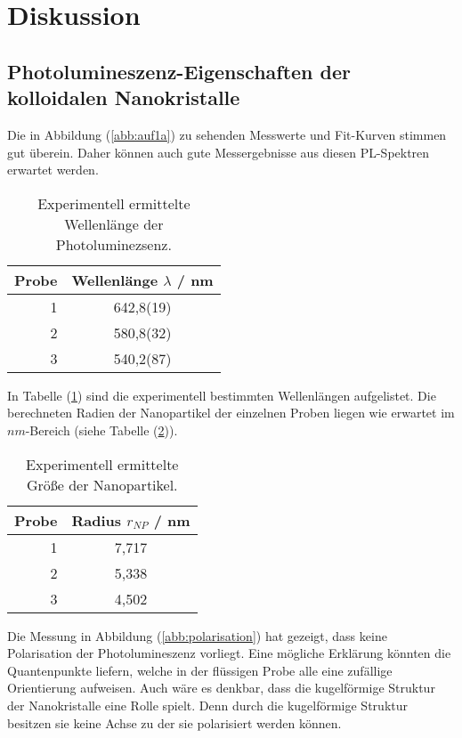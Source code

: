 \section{Diskussion}
\subsection{Photolumineszenz-Eigenschaften der kolloidalen Nanokristalle}
Die in Abbildung (\ref{abb:auf1a}) zu sehenden Messwerte und Fit-Kurven stimmen gut \"{u}berein.
Daher k\"{o}nnen auch gute Messergebnisse aus diesen PL-Spektren erwartet werden.
\begin{table}
	\centering
	\caption{Experimentell ermittelte Wellenl\"{a}nge der Photoluminezsenz.}
\begin{tabular}{|r|c|}
	\hline
	{Probe} & {Wellenl\"{a}nge $\lambda$ / nm} \\
	\hline
	1	& 642,8(19)  \\
	2	& 580,8(32)  \\
	3	& 540,2(87)  \\
	\hline
\end{tabular}
\label{tab:disku1}
\end{table}
In Tabelle (\ref{tab:disku1}) sind die experimentell bestimmten Wellenl\"{a}ngen aufgelistet.
Die berechneten Radien der Nanopartikel der einzelnen Proben liegen wie erwartet im $nm$-Bereich (siehe Tabelle (\ref{tab:disku2})).
\begin{table}
	\centering
	\caption{Experimentell ermittelte Gr\"{o}{\ss}e der Nanopartikel.}
\begin{tabular}{|r|c|}
	\hline
	{Probe} & {Radius $r_{NP}$ / nm} \\
	\hline
	1	&	7,717	\\
	2	&	5,338	\\
	3	&	4,502	\\
	\hline
\end{tabular}
\label{tab:disku2}
\end{table}

\bigskip
Die Messung in Abbildung (\ref{abb:polarisation}) hat gezeigt, dass keine Polarisation der Photolumines{\-}zenz vorliegt.
Eine m\"{o}gliche Erkl\"{a}rung k\"{o}nnten die Quantenpunkte liefern, welche in der fl\"{u}ssigen Probe alle eine zuf\"{a}llige Orientierung aufweisen.
Auch w\"{a}re es denkbar, dass die kugelf\"{o}rmige Struktur der Nanokristalle eine Rolle spielt.
Denn durch die kugelf\"{o}rmige Struktur besitzen sie keine Achse zu der sie polarisiert werden k\"{o}nnen.

